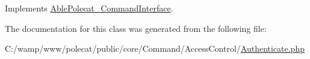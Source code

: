 Implements \hyperlink{interface_able_polecat___command_interface_a6821480fe527af0afdf3691d7cffad5f}{Able\+Polecat\+\_\+\+Command\+Interface}.



The documentation for this class was generated from the following file\+:\begin{DoxyCompactItemize}
\item 
C\+:/wamp/www/polecat/public/core/\+Command/\+Access\+Control/\hyperlink{_authenticate_8php}{Authenticate.\+php}\end{DoxyCompactItemize}
